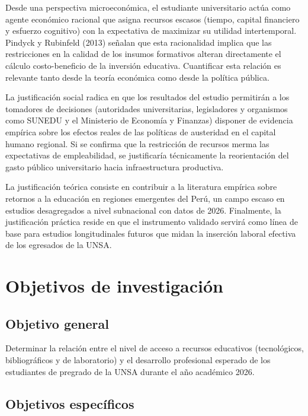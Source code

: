 \documentclass[11pt, a4paper]{article}
\begin{document}
Desde una perspectiva microeconómica, el estudiante universitario actúa como agente económico racional que asigna recursos escasos (tiempo, capital financiero y esfuerzo cognitivo) con la expectativa de maximizar su utilidad intertemporal. Pindyck y Rubinfeld (2013) señalan que esta racionalidad implica que las restricciones en la calidad de los insumos formativos alteran directamente el cálculo costo-beneficio de la inversión educativa. Cuantificar esta relación es relevante tanto desde la teoría económica como desde la política pública.

La justificación social radica en que los resultados del estudio permitirán a los tomadores de decisiones (autoridades universitarias, legisladores y organismos como SUNEDU y el Ministerio de Economía y Finanzas) disponer de evidencia empírica sobre los efectos reales de las políticas de austeridad en el capital humano regional. Si se confirma que la restricción de recursos merma las expectativas de empleabilidad, se justificaría técnicamente la reorientación del gasto público universitario hacia infraestructura productiva.

La justificación teórica consiste en contribuir a la literatura empírica sobre retornos a la educación en regiones emergentes del Perú, un campo escaso en estudios desagregados a nivel subnacional con datos de 2026. Finalmente, la justificación práctica reside en que el instrumento validado servirá como línea de base para estudios longitudinales futuros que midan la inserción laboral efectiva de los egresados de la UNSA.

\section{Objetivos de investigación}

\subsection{Objetivo general}

Determinar la relación entre el nivel de acceso a recursos educativos (tecnológicos, bibliográficos y de laboratorio) y el desarrollo profesional esperado de los estudiantes de pregrado de la UNSA durante el año académico 2026.

\subsection{Objetivos específicos}
\end{document}
